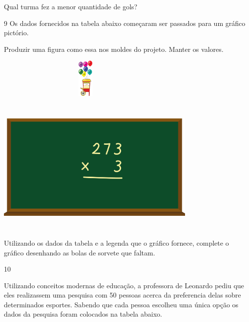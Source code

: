\begin{escolha}
\begin{escolha}
\item
  Qual turma fez a menor quantidade de gols?
\end{escolha}

\num{9} Os dados fornecidos na tabela abaixo começaram ser passados para um
gráfico pictório.

Produzir uma figura como essa nos moldes do projeto. Manter os valores.

\includegraphics[width=3.47436in,height=0.75022in]{media/image98.png}

\includegraphics[width=3.86538in,height=2.63899in]{media/image99.png}

Utilizando os dados da tabela e a legenda que o gráfico fornece,
complete o gráfico desenhando as bolas de sorvete que faltam.


\num{10}

Utilizando conceitos modernas de educação, a professora de Leonardo
pediu que eles realizassem uma pesquisa com 50 pessoas acerca da
preferencia delas sobre determinados esportes. Sabendo que cada pessoa
escolheu uma única opção os dados da pesquisa foram colocados na tabela
abaixo.


\end{escolha}
